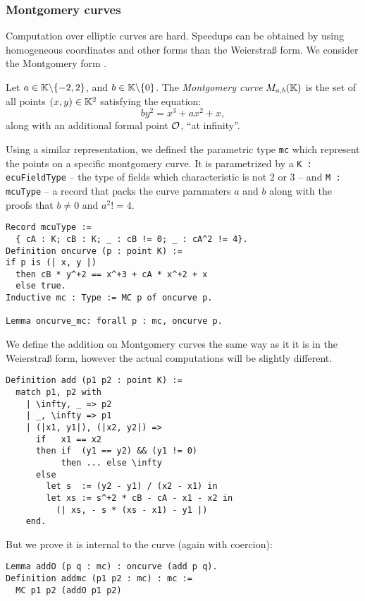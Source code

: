 \subsubsection{Montgomery curves}
\label{montgomery}
Computation over elliptic curves are hard. Speedups can be obtained by using
homogeneous coordinates and other forms than the Weierstra{\ss} form. We consider
the Montgomery form \cite{MontgomerySpeeding}.

\begin{definition}
  Let $a \in \mathbb{K} \backslash \{-2, 2\}$, and $b \in \mathbb{K} \backslash \{ 0\}$. The \textit{Montgomery curve} $M_{a,b}(\mathbb{K})$ is the set of all points $(x,y) \in \mathbb{K}^2$ satisfying the equation:
  $$by^2 = x^3 + ax^2 + x,$$
  along with an additional formal point $\mathcal{O}$, ``at infinity''.
\end{definition}
Using a similar representation, we defined the parametric type \texttt{mc} which
represent the points on a specific montgomery curve. It is parametrized by
a \texttt{K : ecuFieldType} -- the type of fields which characteristic is not 2 or 3 --
and \texttt{M : mcuType} -- a record that packs the curve paramaters $a$ and $b$
along with the proofs that $b \neq 0$ and $a^2 != 4$.
\begin{lstlisting}[language=Coq]
Record mcuType :=
  { cA : K; cB : K; _ : cB != 0; _ : cA^2 != 4}.
Definition oncurve (p : point K) :=
if p is (| x, y |)
  then cB * y^+2 == x^+3 + cA * x^+2 + x
  else true.
Inductive mc : Type := MC p of oncurve p.

Lemma oncurve_mc: forall p : mc, oncurve p.
\end{lstlisting}
We define the addition on Montgomery curves the same way as it it is in the Weierstra{\ss} form,
however the actual computations will be slightly different.
\begin{lstlisting}[language=Coq]
Definition add (p1 p2 : point K) :=
  match p1, p2 with
    | \infty, _ => p2
    | _, \infty => p1
    | (|x1, y1|), (|x2, y2|) =>
      if   x1 == x2
      then if  (y1 == y2) && (y1 != 0)
           then ... else \infty
      else
        let s  := (y2 - y1) / (x2 - x1) in
        let xs := s^+2 * cB - cA - x1 - x2 in
          (| xs, - s * (xs - x1) - y1 |)
    end.
\end{lstlisting}
But we prove it is internal to the curve (again with coercion):
\begin{lstlisting}[language=Coq]
Lemma addO (p q : mc) : oncurve (add p q).
Definition addmc (p1 p2 : mc) : mc :=
  MC p1 p2 (addO p1 p2)
\end{lstlisting}

